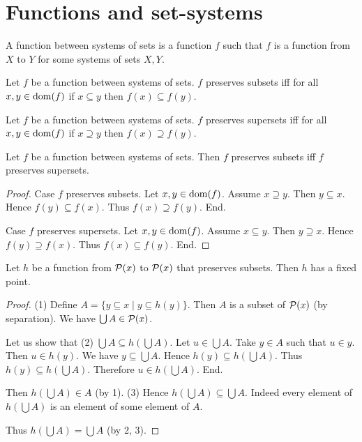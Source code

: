 \documentclass[../../sets-and-functions.ftl.tex]{subfiles}
\begin{document}
  \section{Functions and set-systems}

  \begin{forthel}
    \begin{definition}
      A function between systems of sets is a function $f$ such that $f$ is a function from $X$ to $Y$ for some systems of sets $X, Y$.
    \end{definition}

    \begin{definition}
      Let $f$ be a function between systems of sets.
      $f$ preserves subsets iff for all $x,y \in \operatorname{dom}(f)$ if $x \subseteq y$ then $f(x) \subseteq f(y)$.
    \end{definition}

    \begin{definition}
      Let $f$ be a function between systems of sets.
      $f$ preserves supersets iff for all $x,y \in \operatorname{dom}(f)$ if $x \supseteq y$ then $f(x) \supseteq f(y)$.
    \end{definition}

    \begin{lemma}
      Let $f$ be a function between systems of sets.
      Then $f$ preserves subsets iff $f$ preserves supersets.
    \end{lemma}
    \begin{proof}
      Case $f$ preserves subsets.
        Let $x,y \in \operatorname{dom}(f)$.
        Assume $x \supseteq y$.
        Then $y \subseteq x$.
        Hence $f(y) \subseteq f(x)$.
        Thus $f(x) \supseteq f(y)$.
      End.

      Case $f$ preserves supersets.
        Let $x,y \in \operatorname{dom}(f)$.
        Assume $x \subseteq y$.
        Then $y \supseteq x$.
        Hence $f(y) \supseteq f(x)$.
        Thus $f(x) \subseteq f(y)$.
      End.
    \end{proof}

    \begin{theorem}[SF 01 05 636019]
      Let $h$ be a function from $\mathcal{P}(x)$ to $\mathcal{P}(x)$ that preserves subsets.
      Then $h$ has a fixed point.
    \end{theorem}
    \begin{proof}
      (1) Define $A = \{ y \subseteq x \mid y \subseteq h(y) \}$.
      Then $A$ is a subset of $\mathcal{P}(x)$ (by separation).
      We have $\bigcup A \in \mathcal{P}(x)$.

      Let us show that (2) $\bigcup A \subseteq h(\bigcup A)$.
        Let $u \in \bigcup A$.
        Take $y \in A$ such that $u \in y$.
        Then $u \in h(y)$.
        We have $y \subseteq \bigcup A$.
        Hence $h(y) \subseteq h(\bigcup A)$.
        Thus $h(y) \subseteq h(\bigcup A)$.
        Therefore $u \in h(\bigcup A)$.
      End.

      Then $h(\bigcup A) \in A$ (by 1).
      (3) Hence $h(\bigcup A) \subseteq \bigcup A$.
      Indeed every element of $h(\bigcup A)$ is an element of some element of $A$.

      Thus $h(\bigcup A) = \bigcup A$ (by 2, 3).
    \end{proof}
  \end{forthel}
\end{document}

